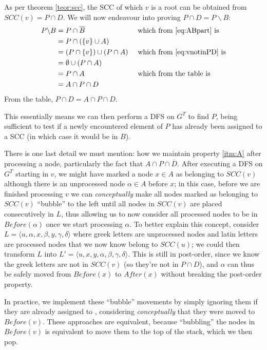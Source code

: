 As per theorem \ref{teor:scc}, the \acrshort{SCC} of which $v$ is a root can be obtained from $SCC(v)=P \cap D$. We will now endeavour into proving $P \cap D = P \backslash B$:
\begin{alignat*}{2}
    P \backslash B &= P \cap \overline{B}&&\text{ which from \eqref{eq:ABpart} is} \\
                   &= P \cap (\{v\} \cup A) && \\
                   &= (P \cap \{v\}) \cup (P \cap A)&&\text{ which from \eqref{eq:vnotinPD} is}\\
                   &= \emptyset \cup (P \cap A)&&\\
                   &= P \cap A &&\text{ which from the table is }\\
                   &= A \cap P \cap D &&
\end{alignat*}
From the table, $P \cap D = A \cap P \cap D$.\par
This essentially means we can then perform a \acrshort{DFS} on $G^T$ to find $P$, being sufficient to test if a newly encountered element of $P$ has already been assigned to a \acrshort{SCC} (in which case it would be in $B$).\par
There is one last detail we must mention: how we maintain property \ref{itm:A} after processing a node, particularly the fact that \sout{$A \cap P \cap \overline{D}$}. After executing a \acrshort{DFS} on $G^T$ starting in $v$, we might have marked a node $x \in A$ as belonging to $SCC(v)$ although there is an unprocessed node $\alpha \in A$ before $x$; in this case, before we are finished processing $v$ we can \emph{conceptually} make all nodes marked as belonging to $SCC(v)$ ``bubble'' to the left until all nodes in $SCC(v)$ are placed consecutively in $L$, thus allowing us to now consider all processed nodes to be in $Before(\alpha)$ once we start processing $\alpha$. To better explain this concept, consider $L=\langle u, \alpha, x, \beta, y, \gamma, \delta \rangle $ where greek letters are unprocessed nodes and latin letters are processed nodes that we now know belong to $SCC(u)$; we could then transform $L$ into $L'=\langle u, x, y, \alpha, \beta, \gamma, \delta \rangle$. This is still in post-order, since we know the greek letters are not in $SCC(v)$ (so they're not in $P \cap D$), and $\alpha$ can thus be safely moved from $Before(x)$ to $After(x)$ without breaking the post-order property.\par
In practice, we implement these ``bubble'' movements by simply ignoring them if they are already assigned to , considering \emph{conceptually} that they were moved to $Before(v)$. These approaches are equivalent, because ``bubbling'' the nodes in $Before(v)$ is equivalent to move them to the top of the stack, which we then pop. 

